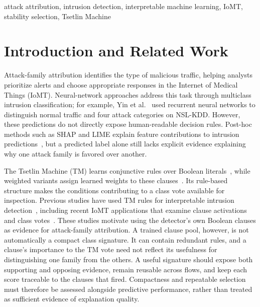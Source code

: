 \documentclass[conference]{IEEEtran}
\begin{document}
\begin{IEEEkeywords}
attack attribution, intrusion detection, interpretable machine learning,
IoMT, stability selection, Tsetlin Machine
\end{IEEEkeywords}

\section{Introduction and Related Work}
Attack-family attribution identifies the type of malicious traffic,
helping analysts prioritize alerts and choose appropriate responses in
the Internet of Medical Things (IoMT). Neural-network approaches address
this task through multiclass intrusion classification; for example,
Yin et al.~\cite{yin2017} used recurrent neural networks to distinguish
normal traffic and four attack categories on NSL-KDD. However, these
predictions do not directly expose human-readable decision rules.
Post-hoc methods such as SHAP and LIME explain feature contributions to
intrusion predictions~\cite{xaiids2025}, but a predicted label alone
still lacks explicit evidence explaining why one attack family is
favored over another.

The Tsetlin Machine (TM) learns conjunctive rules over Boolean
literals~\cite{granmo2018}, while weighted variants assign learned
weights to these clauses~\cite{phoulady2020}. Its rule-based structure
makes the conditions contributing to a class vote available for
inspection. Previous studies have used TM rules for interpretable
intrusion detection~\cite{abeyrathna2020}, including recent IoMT
applications that examine clause activations and class
votes~\cite{jaiswal2026iomt}. These studies motivate
using the detector's own Boolean clauses as evidence for attack-family
attribution. A trained clause pool, however, is not automatically a compact class
signature. It can contain redundant rules, and a clause's importance
to the TM vote need not reflect its usefulness for distinguishing one
family from the others. A useful signature should expose both
supporting and opposing evidence, remain reusable across flows, and
keep each score traceable to the clauses that fired. Compactness and
repeatable selection must therefore be assessed alongside predictive
performance, rather than treated as sufficient evidence of explanation
quality.
\end{document}
